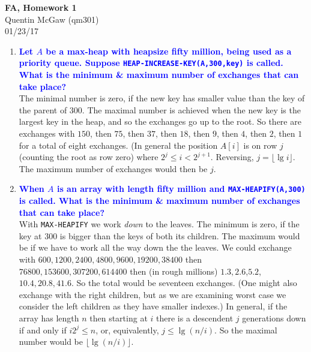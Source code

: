 \documentclass[11pt]{article}
\begin{document}
\begin{center} {\Large\bf FA, Homework 1}  \\ Quentin McGaw (qm301) \\ 01/23/17
\end{center}

\begin{enumerate}
\item \textbf{\textcolor{blue}{Let $A$ be a max-heap with heapsize fifty 
million, being used as a priority queue.  Suppose 
{\tt HEAP-INCREASE-KEY(A,300,key)} is called. What is the minimum & maximum number 
of exchanges that can take place?}}
    \\ The minimal number is zero, if the new key has smaller value than
    the key of the parent of $300$.  The maximal number is achieved when
    the new key is the largest key in the heap, and so the exchanges go
    up to the root.  So there are exchanges with $150$, then $75$, then
    $37$, then $18$, then $9$, then $4$, then $2$, then $1$ for a total
    of eight exchanges.  (In general the position $A[i]$ is on row
    $j$ (counting the root as row zero)
    where $2^j\leq i < 2^{j+1}$.  Reversing, $j=\lfloor \lg i\rfloor$.
    The maximum number of exchanges would then be $j$.

\item \textbf{\textcolor{blue}{When $A$ is an array with length fifty 
million and {\tt MAX-HEAPIFY(A,300)} is called. What is the minimum & maximum 
number of exchanges that can take place?}}
    \\ With {\tt MAX-HEAPIFY} we work {\em down} to the leaves.  The minimum
    is zero, if the key at $300$ is bigger than the keys of both its children.
    The maximum would be if we have to work all the way down the the leaves.
    We could exchange with $600,1200,2400,4800,9600,19200,38400$ 
    then $76800,153600,307200,614400$ then (in rough millions) $1.3,2.6$,$5.2$,
    $10.4, 20.8,41.6$.  So the total would be seventeen exchanges.  (One might also 
    exchange with the right children, but as we are examining worst case we
    consider the left children as they have smaller indexes.)  In general, if
    the array has length $n$ then starting at $i$ there is a descendent $j$
    generations down if and only if $i2^j\leq n$, or, equivalently, $j \leq \lg(n/i)$.
    So the maximal number would be $\lfloor \lg(n/i)\rfloor$.


\end{enumerate}
\end{document}
